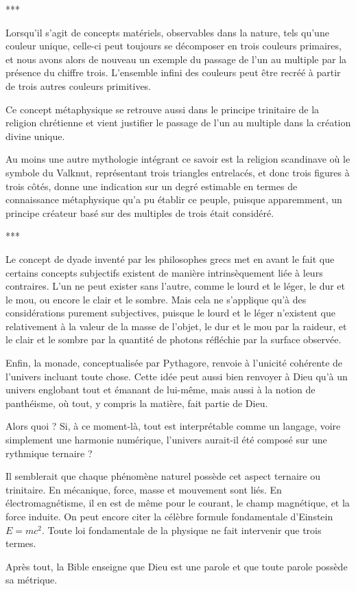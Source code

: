 \begin{center}
***
\end{center}

Lorsqu'il s'agit de concepts matériels, observables dans la nature, tels qu'une couleur unique, celle-ci peut toujours se décomposer en trois couleurs primaires, et nous avons alors de nouveau un exemple du passage de l'un au multiple par la présence du chiffre trois. L'ensemble infini des couleurs peut être recréé à partir de trois autres couleurs primitives.

Ce concept métaphysique se retrouve aussi dans le principe trinitaire de la religion chrétienne et vient justifier le passage de l'un au multiple dans la création divine unique.

Au moins une autre mythologie intégrant ce savoir est la religion scandinave où le symbole du Valknut, représentant trois triangles entrelacés, et donc trois figures à trois côtés, donne une indication sur un degré estimable en termes de connaissance métaphysique qu'a pu établir ce peuple, puisque apparemment, un principe créateur basé sur des multiples de trois était considéré.


\begin{center}
***
\end{center}

Le concept de dyade inventé par les philosophes grecs met en avant le fait que certains concepts subjectifs existent de manière intrinsèquement liée à leurs contraires. L'un ne peut exister sans l'autre, comme le lourd et le léger, le dur et le mou, ou encore le clair et le sombre. Mais cela ne s'applique qu'à des considérations purement subjectives, puisque le lourd et le léger n'existent que relativement à la valeur de la masse de l'objet, le dur et le mou par la raideur, et le clair et le sombre par la quantité de photons réfléchie par la surface observée.

Enfin, la monade, conceptualisée par Pythagore, renvoie à l'unicité cohérente de l'univers incluant toute chose. Cette idée peut aussi bien renvoyer à Dieu qu'à un univers englobant tout et émanant de lui-même, mais aussi à la notion de panthéisme, où tout, y compris la matière, fait partie de Dieu.

Alors quoi ? Si, à ce moment-là, tout est interprétable comme un langage, voire simplement une harmonie numérique, l'univers aurait-il été composé sur une rythmique ternaire ?

Il semblerait que chaque phénomène naturel possède cet aspect ternaire ou trinitaire. En mécanique, force, masse et mouvement sont liés. En électromagnétisme, il en est de même pour le courant, le champ magnétique, et la force induite. On peut encore citer la célèbre formule fondamentale d’Einstein $E = mc^2$. Toute loi fondamentale de la physique ne fait intervenir que trois termes.

Après tout, la Bible enseigne que Dieu est une parole et que toute parole possède sa métrique.